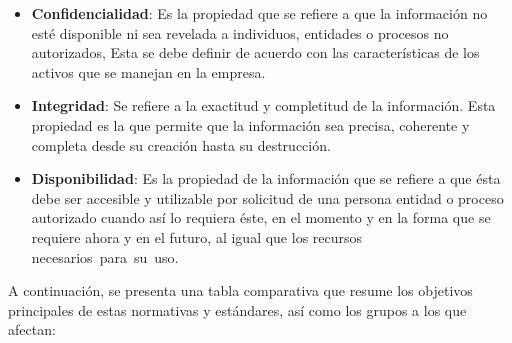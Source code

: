 \documentclass[a4paper, 11pt]{article}
\begin{document}
\begin{itemize}
\item \textbf{Confidencialidad}: Es la propiedad que se refiere a que la información no esté disponible ni sea revelada a individuos, entidades o procesos no autorizados, Esta se debe definir de acuerdo con las características de los activos que se manejan en la empresa.
\item \textbf{Integridad}: Se refiere a la exactitud y completitud de la información. Esta propiedad es la que permite que la información sea precisa, coherente y completa desde su creación hasta su destrucción. 
\item \textbf{Disponibilidad}: Es la propiedad de la información que se refiere a que ésta debe ser accesible y utilizable por solicitud de una persona entidad o proceso autorizado cuando así lo requiera éste, en el momento y en la forma que se requiere ahora y en el futuro, al igual que los recursos necesarios para su uso.
\end{itemize}


A continuación, se presenta una tabla comparativa que resume los objetivos principales de estas normativas y estándares, así como los grupos a los que afectan:
\end{document}
